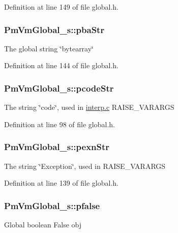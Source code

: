 Definition at line 149 of file global.\-h.

\hypertarget{struct_pm_vm_global__s_a445bf221a7bdaa34cd0190398a1feb4c}{
\subsubsection[{pba\-Str}]{ Pm\-Vm\-Global\-\_\-s\-::pba\-Str}}\label{struct_pm_vm_global__s_a445bf221a7bdaa34cd0190398a1feb4c}
The global string \char`\"{}bytearray\char`\"{} 

Definition at line 144 of file global.\-h.

\hypertarget{struct_pm_vm_global__s_aaccbf51ac51dc535f1cc4d2986af6266}{
\subsubsection[{pcode\-Str}]{ Pm\-Vm\-Global\-\_\-s\-::pcode\-Str}}\label{struct_pm_vm_global__s_aaccbf51ac51dc535f1cc4d2986af6266}
The string \char`\"{}code\char`\"{}, used in \hyperlink{interp_8c}{interp.\-c} R\-A\-I\-S\-E\-\_\-\-V\-A\-R\-A\-R\-G\-S 

Definition at line 98 of file global.\-h.

\hypertarget{struct_pm_vm_global__s_a70d20a4e7632f9eefbc36f655089f9cf}{
\subsubsection[{pexn\-Str}]{ Pm\-Vm\-Global\-\_\-s\-::pexn\-Str}}\label{struct_pm_vm_global__s_a70d20a4e7632f9eefbc36f655089f9cf}
The string \char`\"{}\-Exception\char`\"{}, used in R\-A\-I\-S\-E\-\_\-\-V\-A\-R\-A\-R\-G\-S 

Definition at line 139 of file global.\-h.

\hypertarget{struct_pm_vm_global__s_a91bb3e3da979ed5723c2d95a51a91f57}{
\subsubsection[{pfalse}]{ Pm\-Vm\-Global\-\_\-s\-::pfalse}}\label{struct_pm_vm_global__s_a91bb3e3da979ed5723c2d95a51a91f57}
Global boolean False obj 

